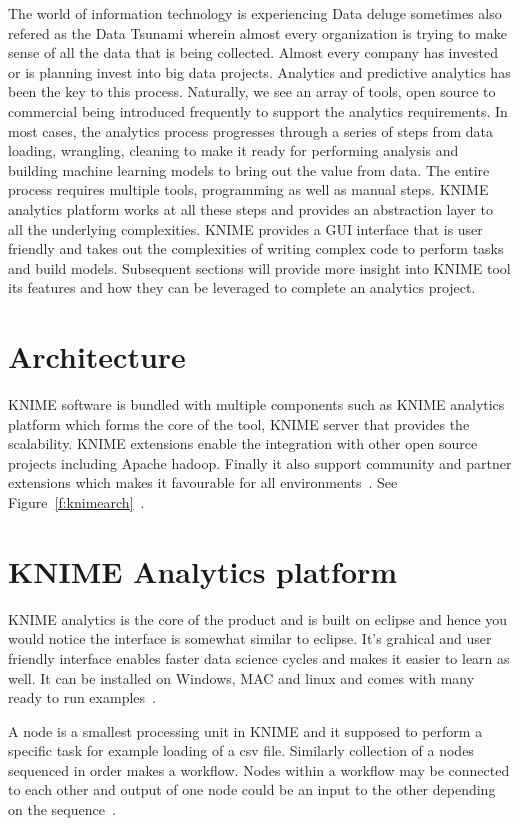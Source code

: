 The world of information technology is experiencing Data deluge
sometimes also refered as the Data Tsunami wherein almost every
organization is trying to make sense of all the data that is being
collected. Almost every company has invested or is planning invest
into big data projects. Analytics and predictive analytics has been
the key to this process. Naturally, we see an array of tools, open
source to commercial being introduced frequently to support the
analytics requirements. In most cases, the analytics process
progresses through a series of steps from data loading, wrangling,
cleaning to make it ready for performing analysis and building machine
learning models to bring out the value from data.  The entire process
requires multiple tools, programming as well as manual steps.  KNIME
analytics platform works at all these steps and provides an
abstraction layer to all the underlying complexities. KNIME provides a
GUI interface that is user friendly and takes out the complexities of
writing complex code to perform tasks and build models. Subsequent
sections will provide more insight into KNIME tool its features and
how they can be leveraged to complete an analytics project.

\section{Architecture}
KNIME software is bundled with multiple components such as KNIME
analytics platform which forms the core of the tool, KNIME server that
provides the scalability. KNIME extensions enable the integration with
other open source projects including Apache hadoop. Finally it also
support community and partner extensions which makes it favourable for
all environments~\cite{hid-sp18-517-ksw}.  See
Figure~\ref{f:knimearch}~\cite{hid-sp18-517-ksw}.

\section{KNIME Analytics platform}
KNIME analytics is the core of the product and is built on eclipse and
hence you would notice the interface is somewhat similar to
eclipse. It's grahical and user friendly interface enables faster data
science cycles and makes it easier to learn as well. It can be
installed on Windows, MAC and linux and comes with many ready to run
examples~\cite{hid-sp18-517-kap}.

A node is a smallest processing unit in KNIME and it supposed to
perform a specific task for example loading of a csv file. Similarly
collection of a nodes sequenced in order makes a workflow. Nodes
within a workflow may be connected to each other and output of one
node could be an input to the other depending on the
sequence~\cite{hid-sp18-517-kintro}.

